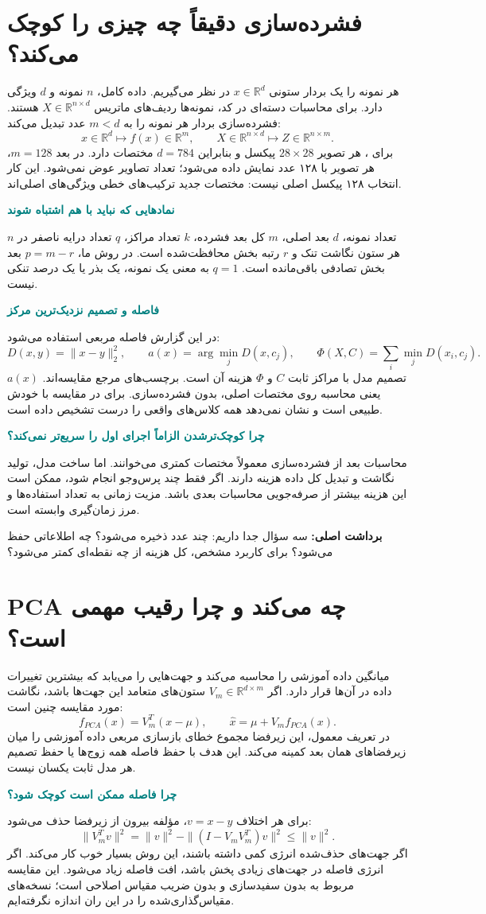 \documentclass[11pt,a4paper]{article}
\newcommand{\lesson}[1]{\clearpage\section{#1}}
\newcommand{\key}[1]{\par\vspace{4pt}\noindent\colorbox{pale}{\parbox{\dimexpr\textwidth-2\fboxsep\relax}{\textbf{برداشت اصلی:} #1}}\par\vspace{3pt}}
\newcommand{\sub}[1]{\par\vspace{3pt}\textbf{\textcolor{teal}{#1}}\par}
\begin{document}
\lesson{فشرده‌سازی دقیقاً چه چیزی را کوچک می‌کند؟}
هر نمونه را یک بردار ستونی \(x\in\mathbb{R}^{d}\) در نظر می‌گیریم. داده کامل، \(n\) نمونه و \(d\) ویژگی دارد. برای محاسبات دسته‌ای در کد، نمونه‌ها ردیف‌های ماتریس \(X\in\mathbb{R}^{n\times d}\) هستند. فشرده‌سازی بردار هر نمونه را به \(m<d\) عدد تبدیل می‌کند:
\[
 x\in\mathbb{R}^{d}\longmapsto f(x)\in\mathbb{R}^{m},
 \qquad X\in\mathbb{R}^{n\times d}\longmapsto Z\in\mathbb{R}^{n\times m}.
\]
برای ، هر تصویر \(28\times28\) پیکسل و بنابراین \(d=784\) مختصات دارد. در بعد \(m=128\)، هر تصویر با ۱۲۸ عدد نمایش داده می‌شود؛ تعداد تصاویر عوض نمی‌شود. این کار انتخاب ۱۲۸ پیکسل اصلی نیست: مختصات جدید ترکیب‌های خطی ویژگی‌های اصلی‌اند.

\sub{نمادهایی که نباید با هم اشتباه شوند}
\(n\) تعداد نمونه، \(d\) بعد اصلی، \(m\) کل بعد فشرده، \(k\) تعداد مراکز، \(q\) تعداد درایه ناصفر در هر ستون نگاشت تنک و \(r\) رتبه بخش محافظت‌شده است. در روش ما، \(p=m-r\) بعد بخش تصادفی باقی‌مانده است. \(q=1\) به معنی یک نمونه، یک بذر یا یک درصد تنکی نیست.

\sub{فاصله و تصمیم نزدیک‌ترین مرکز}
در این گزارش فاصله مربعی استفاده می‌شود:
\[
 D(x,y)=\|x-y\|_2^2,\qquad
 a(x)=\arg\min_j D(x,c_j),\qquad
 \Phi(X,C)=\sum_i\min_j D(x_i,c_j).
\]
\(a(x)\) تصمیم مدل با مراکز ثابت \(C\) و \(\Phi\) هزینه آن است. برچسب‌های  مرجع مقایسه‌اند.  یعنی محاسبه روی مختصات اصلی، بدون فشرده‌سازی.  برای  در مقایسه با خودش طبیعی است و نشان نمی‌دهد همه کلاس‌های واقعی را درست تشخیص داده است.

\sub{چرا کوچک‌ترشدن الزاماً اجرای اول را سریع‌تر نمی‌کند؟}
محاسبات بعد از فشرده‌سازی معمولاً مختصات کمتری می‌خوانند. اما ساخت مدل، تولید نگاشت و تبدیل کل داده هزینه دارند. اگر فقط چند پرس‌وجو انجام شود، ممکن است این هزینه بیشتر از صرفه‌جویی محاسبات بعدی باشد. مزیت زمانی به تعداد استفاده‌ها و مرز زمان‌گیری وابسته است.
\key{سه سؤال جدا داریم: چند عدد ذخیره می‌شود؟ چه اطلاعاتی حفظ می‌شود؟ برای کاربرد مشخص، کل هزینه از چه نقطه‌ای کمتر می‌شود؟}

\lesson{PCA چه می‌کند و چرا رقیب مهمی است؟}
 میانگین داده آموزشی را محاسبه می‌کند و جهت‌هایی را می‌یابد که بیشترین تغییرات داده در آن‌ها قرار دارد. اگر \(V_m\in\mathbb{R}^{d\times m}\) ستون‌های متعامد این جهت‌ها باشد، نگاشت مورد مقایسه چنین است:
\[
 f_{PCA}(x)=V_m^T(x-\mu),\qquad
 \hat{x}=\mu+V_m f_{PCA}(x).
\]
در تعریف معمول، این زیرفضا مجموع خطای بازسازی مربعی داده آموزشی را میان زیرفضاهای همان بعد کمینه می‌کند. این هدف با حفظ فاصله همه زوج‌ها یا حفظ تصمیم هر مدل ثابت یکسان نیست.

\sub{چرا فاصله ممکن است کوچک شود؟}
برای هر اختلاف \(v=x-y\)، مؤلفه بیرون از زیرفضا حذف می‌شود:
\[
 \|V_m^Tv\|^2=\|v\|^2-\|(I-V_mV_m^T)v\|^2\leq\|v\|^2.
\]
اگر جهت‌های حذف‌شده انرژی کمی داشته باشند، این روش بسیار خوب کار می‌کند. اگر انرژی فاصله در جهت‌های زیادی پخش باشد، افت فاصله زیاد می‌شود. این مقایسه مربوط به  بدون سفیدسازی و بدون ضریب مقیاس اصلاحی است؛ نسخه‌های مقیاس‌گذاری‌شده را در این ران اندازه نگرفته‌ایم.
\end{document}
